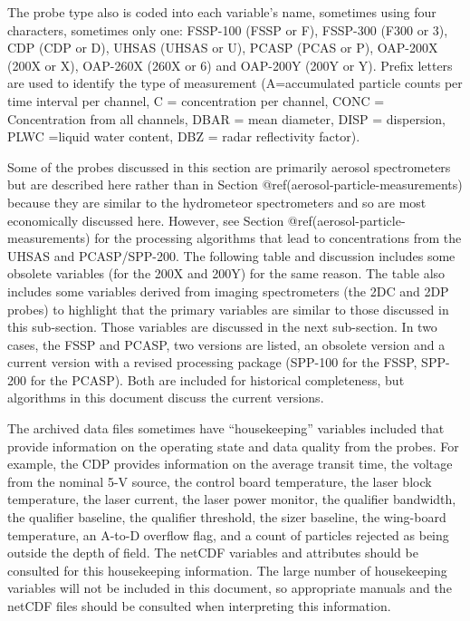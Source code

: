 \documentclass[
  english,
]{book}
\begin{document}
The probe type also is coded into each variable's name, sometimes using
four characters, sometimes only one: FSSP-100 (FSSP or F), FSSP-300
(F300 or 3), CDP (CDP or D), UHSAS (UHSAS or U), PCASP (PCAS or P),
OAP-200X (200X or X), OAP-260X (260X or 6) and OAP-200Y (200Y or Y).
Prefix letters are used to identify the type of measurement
(A=accumulated particle counts per time interval per channel, C =
concentration per channel, CONC = Concentration from all channels, DBAR
= mean diameter, DISP = dispersion, PLWC =liquid water content, DBZ =
radar reflectivity factor).

Some of the probes discussed in this section are primarily aerosol
spectrometers but are described here rather than in Section
@ref(aerosol-particle-measurements) because they are similar to the
hydrometeor spectrometers and so are most economically discussed here.
However, see Section @ref(aerosol-particle-measurements) for the
processing algorithms that lead to concentrations from the UHSAS and
PCASP/SPP-200. The following table and discussion includes some obsolete
variables (for the 200X and 200Y) for the same reason. The table also
includes some variables derived from imaging spectrometers (the 2DC and
2DP probes) to highlight that the primary variables are similar to those
discussed in this sub-section. Those variables are discussed in the next
sub-section. In two cases, the FSSP and PCASP, two versions are listed,
an obsolete version and a current version with a revised processing
package (SPP-100 for the FSSP, SPP-200 for the PCASP). Both are included
for historical completeness, but algorithms in this document discuss the
current versions.

The archived data files sometimes have ``housekeeping'' variables
included that provide information on the operating state and data
quality from the probes. For example, the CDP provides information on
the average transit time, the voltage from the nominal 5-V source, the
control board temperature, the laser block temperature, the laser
current, the laser power monitor, the qualifier bandwidth, the qualifier
baseline, the qualifier threshold, the sizer baseline, the wing-board
temperature, an A-to-D overflow flag, and a count of particles rejected
as being outside the depth of field. The netCDF variables and attributes
should be consulted for this housekeeping information. The large number
of housekeeping variables will not be included in this document, so
appropriate manuals and the netCDF files should be consulted when
interpreting this information.
\end{document}
